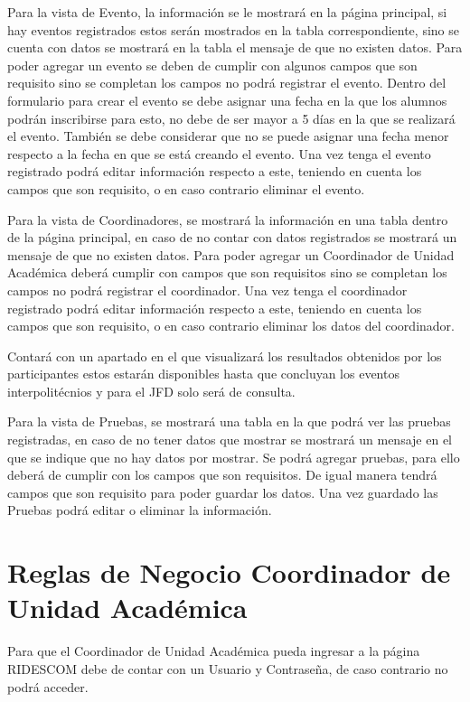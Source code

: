 \noindent Para la vista de Evento, la información se le mostrará en la página principal, si hay eventos registrados estos serán mostrados en la tabla correspondiente, sino se cuenta con datos se mostrará en la tabla el mensaje de que no existen datos.  Para poder agregar un evento se deben de cumplir con algunos campos que son requisito sino se completan los campos no podrá registrar el evento.  Dentro del formulario para crear el evento se debe asignar una fecha en la que los alumnos podrán inscribirse para esto, no debe de ser mayor  a 5 días en la que se realizará el evento. También se debe considerar que no se puede asignar una fecha menor respecto a la fecha en que se está creando el evento. Una vez tenga el evento registrado podrá editar información respecto a este, teniendo en cuenta los campos que son requisito, o en caso contrario eliminar el evento.

\noindent Para la vista de Coordinadores, se mostrará la información en una tabla dentro de la página principal, en caso de no contar con datos registrados se mostrará un mensaje de que no existen datos. Para poder agregar un Coordinador de Unidad Académica deberá cumplir con campos que son requisitos sino se completan los campos no podrá registrar el coordinador. Una vez tenga el coordinador registrado podrá editar información respecto a este, teniendo en cuenta los campos que son requisito, o en caso contrario eliminar los datos del coordinador.

\noindent Contará con un apartado en el que visualizará los resultados obtenidos por los participantes estos estarán disponibles hasta que concluyan los eventos interpolitécnios y para el JFD solo será de consulta.

\noindent Para la vista de Pruebas, se mostrará una tabla en la que podrá ver las pruebas registradas, en caso de no tener datos que mostrar se mostrará un mensaje en el que se indique que no hay datos por mostrar. Se podrá agregar pruebas, para ello deberá de cumplir con los campos que son requisitos. De igual manera tendrá campos que son requisito para poder guardar los datos. Una vez guardado las Pruebas podrá editar o eliminar la información.

\section{Reglas de Negocio Coordinador de Unidad Académica}
\noindent Para que el Coordinador de Unidad Académica pueda ingresar a la página RIDESCOM debe de contar con un Usuario y Contraseña, de caso contrario no podrá acceder.\\

